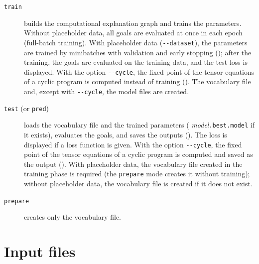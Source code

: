 \documentclass[a4paper]{report}
\begin{document}
\begin{description}
	\item[{\tt train}]
	builds the computational explanation graph and trains the parameters.
	Without placeholder data, all goals are evaluated at once in each epoch
	(full-batch training).  With placeholder data ({\tt -{}-dataset}), the
	parameters are trained by minibatches with validation and early stopping
	(); after the training, the goals are
	evaluated on the training data, and the test loss is displayed.  With the
	option {\tt -{}-cycle}, the fixed point of the tensor equations of a cyclic
	program is computed instead of training ().  The
	vocabulary file and, except with {\tt -{}-cycle}, the model files are created.
	\item[{\tt test} (or {\tt pred})]
	loads the vocabulary file and the trained parameters ({\it
		model}{\tt .best.model} if it exists), evaluates the goals, and saves the
	outputs ().  The loss is displayed if a loss
	function is given.  With the option {\tt -{}-cycle}, the fixed point of the
	tensor equations of a cyclic program is computed and saved as the output
	().  With placeholder data, the vocabulary file
	created in the training phase is required (the {\tt prepare} mode creates
	it without training); without placeholder data, the vocabulary file is
	created if it does not exist.
	\item[{\tt prepare}]
	creates only the vocabulary file.
\end{description}

\section{Input files}
\label{sec:tprism_input}
\end{document}
